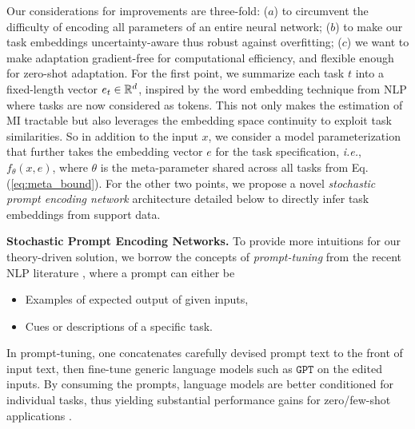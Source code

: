 \documentclass[nohyperref]{article}
\theoremstyle{plain}
\theoremstyle{definition}
\theoremstyle{remark}
\newcommand{\GPT}{\texttt{GPT}}
\newcommand{\tnew}{\text{new}}
\begin{document}
Our considerations for improvements are three-fold: ($a$) to circumvent the difficulty of encoding all parameters of an entire neural network; ($b$) to make our task embeddings uncertainty-aware thus robust against overfitting; ($c$) we want to make adaptation gradient-free for computational efficiency, and flexible enough for zero-shot adaptation. For the first point, we summarize each task $t$ into a fixed-length vector $e_t \in \mathbb{R}^d$, inspired by the word embedding technique from NLP where tasks are now considered as tokens. This not only makes the estimation of MI tractable but also leverages the embedding space continuity to exploit task similarities. So in addition to the input $x$, we consider a model parameterization that further takes the embedding vector $e$ for the task specification, {\it i.e.}, $f_{\theta}(x, e)$, where $\theta$ is the meta-parameter shared across all tasks from Eq. (\ref{eq:meta_bound}). For the other two points, we propose a novel {\it stochastic prompt encoding network} architecture detailed below to directly infer task embeddings from support data. 


{\bf  Stochastic Prompt Encoding Networks.} To provide more intuitions for our theory-driven solution, we borrow the concepts of {\it prompt-tuning} from the recent NLP literature \citep{liu2021pre}, where a prompt can either be
\begin{itemize}
\setlength\itemsep{0pt}
\item Examples of expected output of given inputs,
\item Cues or descriptions of a specific task. 
\end{itemize} 
In prompt-tuning, one concatenates carefully devised prompt text to the front of input text, then fine-tune generic language models such as $\GPT$ on the edited inputs. By consuming the prompts, language models are better conditioned for individual tasks, thus yielding substantial performance gains for zero/few-shot applications \citep{gao2021making}.  
\end{document}
